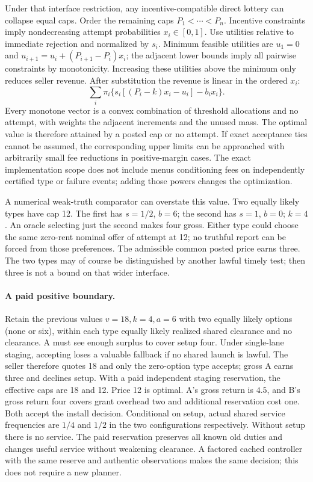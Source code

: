 \documentclass{article}
\begin{document}
Under that interface restriction, any incentive-compatible direct lottery can collapse equal caps. Order the remaining caps $P_1<\cdots<P_n$. Incentive constraints imply nondecreasing attempt probabilities $x_i\in[0,1]$. Use utilities relative to immediate rejection and normalized by $s_i$. Minimum feasible utilities are $u_1=0$ and $u_{i+1}=u_i+(P_{i+1}-P_i)x_i$; the adjacent lower bounds imply all pairwise constraints by monotonicity. Increasing these utilities above the minimum only reduces seller revenue. After substitution the revenue is linear in the ordered $x_i$:
\[
 \sum_i\pi_i\{s_i[(P_i-k)x_i-u_i]-b_ix_i\}.
\]
Every monotone vector is a convex combination of threshold allocations and no attempt, with weights the adjacent increments and the unused mass. The optimal value is therefore attained by a posted cap or no attempt. If exact acceptance ties cannot be assumed, the corresponding upper limits can be approached with arbitrarily small fee reductions in positive-margin cases. The exact implementation scope does not include menus conditioning fees on independently certified type or failure events; adding those powers changes the optimization.

A numerical weak-truth comparator can overstate this value. Two equally likely types have cap 12. The first has $s=1/2$, $b=6$; the second has $s=1$, $b=0$; $k=4$. An oracle selecting just the second makes four gross. Either type could choose the same zero-rent nominal offer of attempt at 12; no truthful report can be forced from those preferences. The admissible common posted price earns three. The two types may of course be distinguished by another lawful timely test; then three is not a bound on that wider interface.

\paragraph{A paid positive boundary.}
Retain the previous values $v=18,k=4,a=6$ with two equally likely options (none or six), within each type equally likely realized shared clearance and no clearance. A must see enough surplus to cover setup four. Under single-lane staging, accepting loses a valuable fallback if no shared launch is lawful. The seller therefore quotes 18 and only the zero-option type accepts; gross A earns three and declines setup. With a paid independent staging reservation, the effective caps are 18 and 12. Price 12 is optimal. A's gross return is $4.5$, and B's gross return four covers grant overhead two and additional reservation cost one. Both accept the install decision. Conditional on setup, actual shared service frequencies are $1/4$ and $1/2$ in the two configurations respectively. Without setup there is no service. The paid reservation preserves all known old duties and changes useful service without weakening clearance. A factored cached controller with the same reserve and authentic observations makes the same decision; this does not require a new planner.
\end{document}
